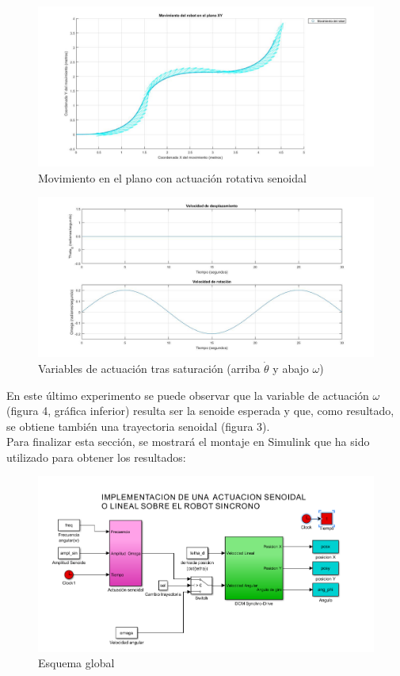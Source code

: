 \documentclass[a4paper,twoside]{article}
\begin{document}
	\begin{figure}[H]
		\centering
		\includegraphics[width=1\textwidth]{exp_MCD_3_1}
		\caption{Movimiento en el plano con actuación rotativa senoidal}
	\end{figure}

	\begin{figure}[H]
		\centering
		\includegraphics[width=1\textwidth]{exp_MCD_3_2}
		\caption{Variables de actuación tras saturación (arriba $\dot{\theta}$ y abajo $\omega$)}
	\end{figure}

	En este último experimento se puede observar que la variable de actuación $\omega$ (figura 4, gráfica inferior) resulta ser la senoide esperada y que, como resultado, se obtiene también una trayectoria senoidal (figura 3).\\

	Para finalizar esta sección, se mostrará el montaje en Simulink que ha sido utilizado para obtener los resultados:
	
	\begin{figure}[H]
		\centering
		\includegraphics[width=1.1\textwidth]{simulink_MCD_1}
		\caption{Esquema global}
	\end{figure}
\end{document}
